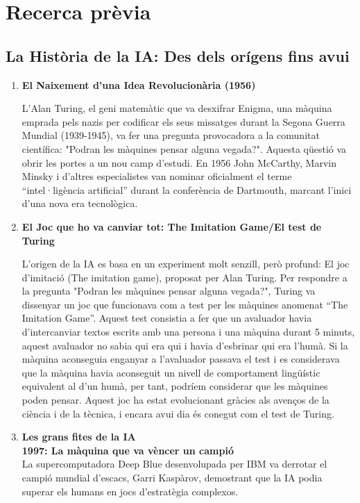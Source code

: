 \chapter{Recerca prèvia}
\label{c:recerca prèvia}

\section{La Història de la IA: Des dels orígens fins avui}
\begin{enumerate}
    \item \textbf{El Naixement d'una Idea Revolucionària (1956)}

    L'Alan Turing, el geni matemàtic que va desxifrar Enigma, una màquina emprada pels nazis per codificar els seus missatges durant la Segona Guerra Mundial (1939-1945), va fer una pregunta provocadora a la comunitat científica: "Podran les màquines pensar alguna vegada?". Aquesta qüestió va obrir les portes a un nou camp d'estudi. En 1956 John McCarthy, Marvin Minsky i d'altres especialistes van nominar oficialment el terme ``intel·ligència artificial'' durant la conferència de Dartmouth, marcant l'inici d'una nova era tecnològica.

    \item \textbf{El Joc que ho va canviar tot: The Imitation Game/El test de Turing}

    L'origen de la IA es basa en un experiment molt senzill, però profund: El joc d'imitació (The imitation game), proposat per Alan Turing. Per respondre a la pregunta "Podran les màquines pensar alguna vegada?", Turing va dissenyar un joc que funcionava com a test per les màquines anomenat ``The Imitation Game''. Aquest test consistia a fer que un avaluador havia d'intercanviar textos escrits amb una persona i una màquina durant 5 minuts, aquest avaluador no sabia qui era qui i havia d'esbrinar qui era l'humà. Si la màquina aconseguia enganyar a l'avaluador passava el test i es considerava que la màquina havia aconseguit un nivell de comportament lingüístic equivalent al d'un humà, per tant, podríem considerar que les màquines poden pensar. Aquest joc ha estat evolucionant gràcies als avenços de la ciència i de la tècnica, i encara avui dia és conegut com el test de Turing.

    \item \textbf{Les grans fites de la IA}\\
    \textbf{1997: La màquina que va vèncer un campió}\\
    La supercomputadora Deep Blue desenvolupada per IBM va derrotar el campió mundial d'escacs, Garri Kaspàrov, demostrant que la IA podia superar els humans en jocs d'estratègia complexos.


\end{enumerate}

